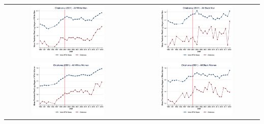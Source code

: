 \documentclass[11pt]{article}
\begin{document}
{\pagebreak
\begin{landscape}
\begin{table}[h!]
    \centering
    \label{fig:pta_ok}
    \begin{tabular}{c c}
          \includegraphics[width = 0.6\textwidth, keepaspectratio]{figures/pta/fin_wm_ok.png} & \includegraphics[width = 0.6\textwidth, keepaspectratio]{figures/pta/fin_bm_ok.png} \\
          \includegraphics[width = 0.6\textwidth, keepaspectratio]{figures/pta/fin_wf_ok.png} & \includegraphics[width = 0.6\textwidth, keepaspectratio]{figures/pta/fin_bf_ok.png}
    \end{tabular}
\end{table}
\end{landscape}

}
\end{document}
